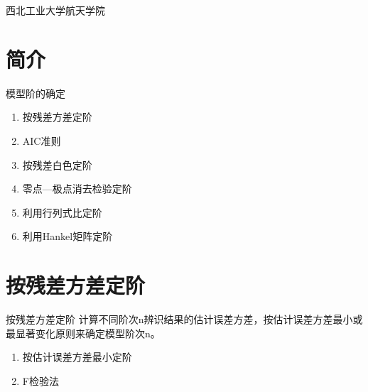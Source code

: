 
\newcommand{\vect}[1]{\boldsymbol{#1}}

\def\lecturename{系统辨识}

\title{\insertlecture}

\author{邢超}

\institute
{
  西北工业大学航天学院
}


\subtitle{}
\date{2012}



\begin{frame}
  \maketitle
\end{frame}


\section{简介}

\begin{frame}{模型阶的确定}
\begin{enumerate}
\item 按残差方差定阶
\item AIC准则
\item 按残差白色定阶
\item 零点—极点消去检验定阶
\item 利用行列式比定阶
\item 利用Hankel矩阵定阶
\end{enumerate}
\end{frame}

\section{按残差方差定阶}
\begin{frame}{按残差方差定阶}
计算不同阶次n辨识结果的估计误差方差，按估计误差方差最小或最显著变化原则来确定模型阶次n。

\begin{enumerate}
\item 按估计误差方差最小定阶
\item F检验法
\end{enumerate}
\end{frame}



